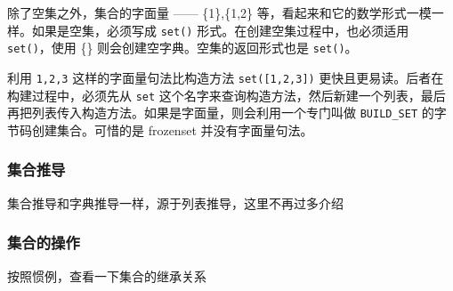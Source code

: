 除了空集之外，集合的字面量 —— \{1\},\{1,2\} 等，看起来和它的数学形式一模一样。如果是空集，必须写成 \texttt{set()} 形式。在创建空集过程中，也必须适用 \texttt{set()}，使用 \{\} 则会创建空字典。空集的返回形式也是 \texttt{set()}。

利用 \texttt{{1,2,3}} 这样的字面量句法比构造方法 \texttt{set([1,2,3])} 更快且更易读。后者在构建过程中，必须先从 \texttt{set} 这个名字来查询构造方法，然后新建一个列表，最后再把列表传入构造方法。如果是字面量，则会利用一个专门叫做 \texttt{BUILD\_SET} 的字节码创建集合。可惜的是 frozenset 并没有字面量句法。

\subsubsection{集合推导}

集合推导和字典推导一样，源于列表推导，这里不再过多介绍

\subsubsection{集合的操作}

按照惯例，查看一下集合的继承关系

